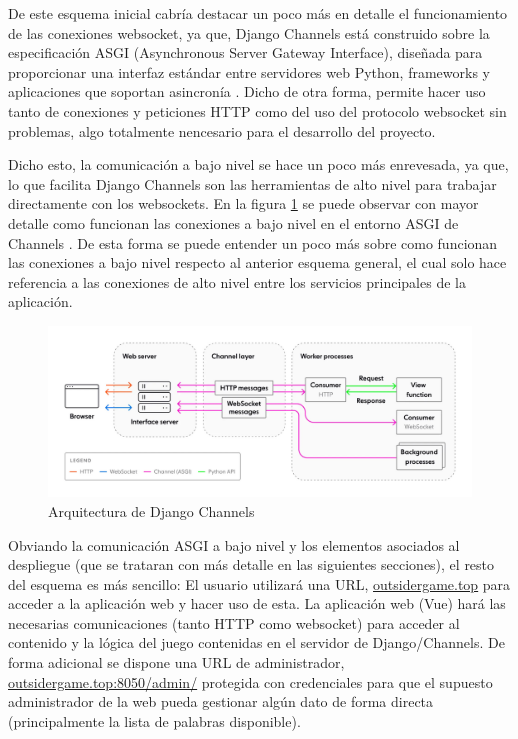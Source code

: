 De este esquema inicial cabría destacar un poco más en detalle el funcionamiento de las conexiones websocket, ya que, Django Channels 
está construido sobre la especificación ASGI (Asynchronous Server Gateway Interface), diseñada para proporcionar una interfaz estándar entre servidores web Python, frameworks y aplicaciones que soportan asincronía \cite{ASGI}. Dicho de otra forma,
permite hacer uso tanto de conexiones y peticiones HTTP como del uso del protocolo websocket sin problemas, algo totalmente nencesario para el desarrollo del proyecto. 

Dicho esto, la comunicación a bajo nivel se hace un poco más enrevesada, ya que, lo que facilita Django Channels son las herramientas de alto
nivel para trabajar directamente con los websockets. En la figura \ref{fig:res_esquemaDjangoChannels} se puede observar con mayor detalle como funcionan
las conexiones a bajo nivel en el entorno ASGI de Channels \cite{whatIsDjangoChannels}. De esta forma se puede entender un poco más sobre como funcionan las 
conexiones a bajo nivel respecto al anterior esquema general, el cual solo hace referencia a las conexiones de alto nivel entre los servicios principales de la aplicación.

\begin{figure}[h]
	\centering
	\includegraphics[width=\textwidth,clip=true]{res_esquemaDjangoChannels.jpg}
	\caption{Arquitectura de Django Channels}
	\label{fig:res_esquemaDjangoChannels}
\end{figure}

Obviando la comunicación ASGI a bajo nivel y los elementos asociados al despliegue (que se trataran con más detalle en las siguientes secciones), el resto del esquema es más sencillo: El usuario utilizará una URL, 
\href{http://outsidergame.top/}{outsidergame.top}  para acceder a la aplicación web y hacer uso de esta. La aplicación web (Vue) hará las necesarias comunicaciones (tanto HTTP como websocket) 
para acceder al contenido y la lógica del juego contenidas en el servidor de Django/Channels. De forma adicional se dispone una URL de administrador, 
\href{http://outsidergame.top:8050/admin/}{outsidergame.top:8050/admin/} protegida con credenciales para que el supuesto administrador de la web 
pueda gestionar algún dato de forma directa (principalmente la lista de palabras disponible).

